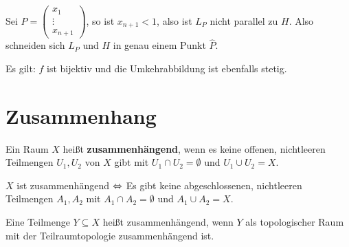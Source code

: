 \begin{beispiel}
    Sei $P = \begin{pmatrix}x_1\\ \vdots \\ x_{n+1}\end{pmatrix}$, so
    ist $x_{n+1} < 1$, also ist $L_P$ nicht parallel zu $H$. Also
    schneiden sich $L_P$ und $H$ in genau einem Punkt $\hat{P}$.

    Es gilt: $f$ ist bijektiv und die Umkehrabbildung ist ebenfalls
    stetig.    
\end{beispiel}
\section{Zusammenhang}
\begin{definition}
    Ein Raum $X$ heißt \textbf{zusammenhängend}, wenn es keine offenen,
    nichtleeren Teilmengen $U_1, U_2$ von $X$ gibt mit 
    $U_1 \cap U_2 = \emptyset$ und $U_1 \cup U_2 = X$.
\end{definition}

\begin{bemerkung}
    $X$ ist zusammenhängend $\Leftrightarrow$ Es gibt keine abgeschlossenen,
    nichtleeren Teilmengen $A_1, A_2$ mit $A_1 \cap A_2 = \emptyset$ 
    und $A_1 \cup A_2 = X$.
\end{bemerkung}

\begin{bemerkung}
    Eine Teilmenge $Y \subseteq X$ heißt zusammenhängend, wenn $Y$
    als topologischer Raum mit der Teilraumtopologie zusammenhängend ist.
\end{bemerkung}

%

